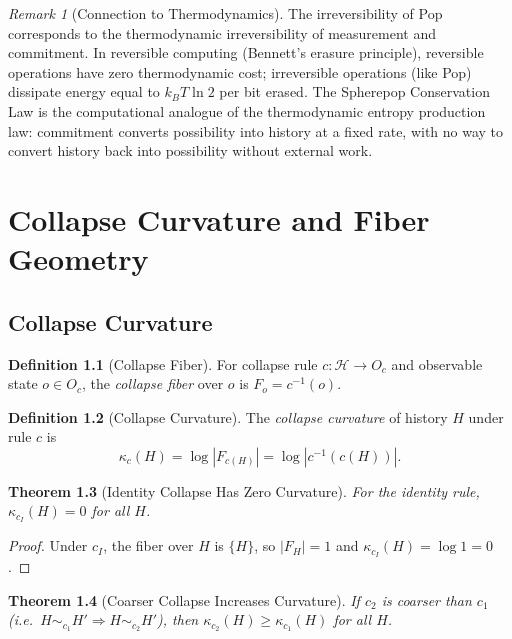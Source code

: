 \documentclass[12pt, a4paper, openany]{book}
\theoremstyle{plain}
\newtheorem{theorem}{Theorem}[chapter]
\theoremstyle{definition}
\newtheorem{definition}[theorem]{Definition}
\theoremstyle{remark}
\newtheorem{remark}[theorem]{Remark}
\newcommand{\calH}{\mathcal{H}}
\begin{document}
\begin{remark}[Connection to Thermodynamics]
The irreversibility of Pop corresponds to the thermodynamic irreversibility of
measurement and commitment. In reversible computing (Bennett's erasure principle),
reversible operations have zero thermodynamic cost; irreversible operations
(like Pop) dissipate energy equal to $k_B T \ln 2$ per bit erased. The
Spherepop Conservation Law is the computational analogue of the thermodynamic
entropy production law: commitment converts possibility into history at a fixed
rate, with no way to convert history back into possibility without external
work.
\end{remark}

\chapter{Collapse Curvature and Fiber Geometry}

\section{Collapse Curvature}

\begin{definition}[Collapse Fiber]
For collapse rule $c : \calH \to O_c$ and observable state $o \in O_c$,
the \emph{collapse fiber} over $o$ is $F_o = c^{-1}(o)$.
\end{definition}

\begin{definition}[Collapse Curvature]
The \emph{collapse curvature} of history $H$ under rule $c$ is
\[
\kappa_c(H) = \log |F_{c(H)}| = \log |c^{-1}(c(H))|.
\]
\end{definition}

\begin{theorem}[Identity Collapse Has Zero Curvature]
For the identity rule, $\kappa_{c_I}(H) = 0$ for all $H$.
\end{theorem}

\begin{proof}
Under $c_I$, the fiber over $H$ is $\{H\}$, so $|F_H| = 1$ and
$\kappa_{c_I}(H) = \log 1 = 0$.
\end{proof}

\begin{theorem}[Coarser Collapse Increases Curvature]
If $c_2$ is coarser than $c_1$ (i.e.\ $H \sim_{c_1} H' \Rightarrow H \sim_{c_2} H'$), then
$\kappa_{c_2}(H) \geq \kappa_{c_1}(H)$ for all $H$.
\end{theorem}
\end{document}
